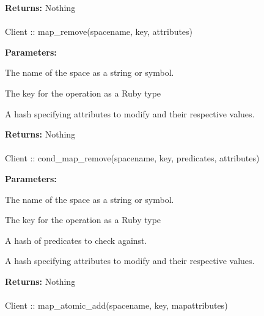 \noindent\textbf{Returns:}
Nothing

\paragraph{}
\begin{ccode}
Client :: map_remove(spacename, key, attributes)
\end{ccode}
\funcdesc 

\noindent\textbf{Parameters:}
\begin{description}[labelindent=\widthof{{attributes}},leftmargin=*,noitemsep,nolistsep,align=right]
\item[spacename] The name of the space as a string or symbol.
\item[key] The key for the operation as a Ruby type
\item[attributes] A hash specifying attributes to modify and their respective values.
\end{description}

\noindent\textbf{Returns:}
Nothing

\paragraph{}
\begin{ccode}
Client :: cond_map_remove(spacename, key, predicates, attributes)
\end{ccode}
\funcdesc 

\noindent\textbf{Parameters:}
\begin{description}[labelindent=\widthof{{predicates}},leftmargin=*,noitemsep,nolistsep,align=right]
\item[spacename] The name of the space as a string or symbol.
\item[key] The key for the operation as a Ruby type
\item[predicates] A hash of predicates to check against.
\item[attributes] A hash specifying attributes to modify and their respective values.
\end{description}

\noindent\textbf{Returns:}
Nothing

\paragraph{}
\begin{ccode}
Client :: map_atomic_add(spacename, key, mapattributes)
\end{ccode}
\funcdesc 

